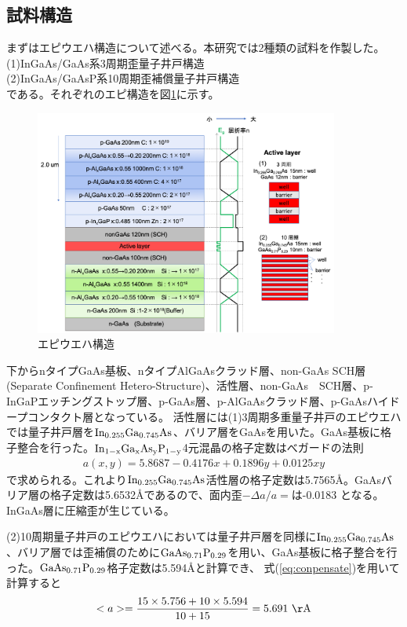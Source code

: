 \subsection{試料構造}%
まずはエピウエハ構造について述べる。本研究では2種類の試料を作製した。\\
(1)InGaAs/GaAs系3周期歪量子井戸構造\\
(2)InGaAs/GaAsP系10周期歪補償量子井戸構造\\
である。それぞれのエピ構造を図\ref{fig:fig_2_1_wafer_structure}に示す。
\begin{figure}[hb]
	\centering
	\includegraphics[width=10cm]{figure/fig_2_1_wafer_structure.png}
	\caption{エピウエハ構造}
	\label{fig:fig_2_1_wafer_structure}
\end{figure}
下からnタイプGaAs基板、nタイプAlGaAsクラッド層、non-GaAs SCH層(Separate Confinement Hetero-Structure)、活性層、non-GaAs　SCH層、p-InGaPエッチングストップ層、p-GaAs層、p-AlGaAsクラッド層、p-GaAsハイドープコンタクト層となっている。
活性層には(1)3周期多重量子井戸のエピウエハでは量子井戸層を$\rm{In_{0.255}Ga_{0.745}As}$、バリア層をGaAsを用いた。GaAs基板に格子整合を行った。$\rm{In_{1-x}Ga_{x}As_{y}P_{1-y}}$4元混晶の格子定数はべガードの法則
\begin{eqnarray}
a(x,y)=5.8687-0.4176x+0.1896y+0.0125xy
\end{eqnarray}
で求められる\cite{ref_iga}。これより$\rm{In_{0.255}Ga_{0.745}As}$活性層の格子定数は5.7565\AA 。GaAsバリア層の格子定数は5.6532\AA であるので、面内歪$-\Delta a/a=$は-0.0183 となる。InGaAs層に圧縮歪が生じている。

(2)10周期量子井戸のエピウエハにおいては量子井戸層を同様に$\rm{In_{0.255}Ga_{0.745}As}$、バリア層では歪補償のために$\rm{GaAs_{0.71}P_{0.29}}$を用い、GaAs基板に格子整合を行った。$\rm{GaAs_{0.71}P_{0.29}}$格子定数は5.594\AA と計算でき、
式(\ref{eq:conpensate})を用いて計算すると
\begin{eqnarray}
<a>=\dfrac{15 \times 5.756+10\times 5.594 }{10+15}=5.691\  \rm{\AA}
\end{eqnarray}

